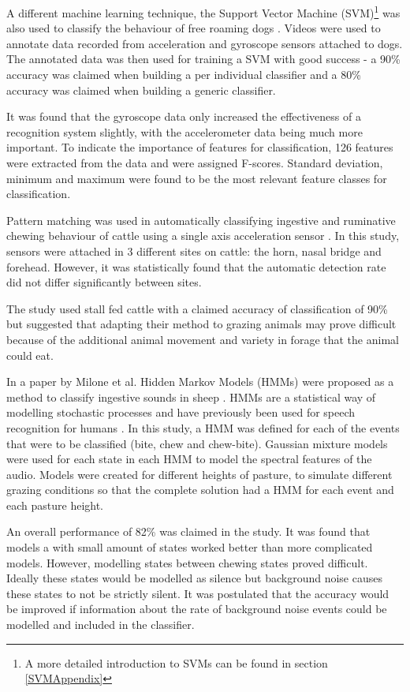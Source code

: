 A different machine learning technique, the Support Vector Machine (SVM)\footnote{A more detailed introduction to SVMs can be found in section \ref{SVMAppendix}} was also used to classify the behaviour of free roaming dogs \cite{Gerencser2013}. Videos were used to annotate data recorded from acceleration and gyroscope sensors attached to dogs. The annotated data was then used for training a SVM with good success - a 90\% accuracy was claimed when building a per individual classifier and a 80\% accuracy was claimed when building a generic classifier. 

It was found that the gyroscope data only increased the effectiveness of a recognition system slightly, with the accelerometer data being much more important. To indicate the importance of features for classification, 126 features were extracted from the data and were assigned F-scores. Standard deviation, minimum and maximum were found to be the most relevant feature classes for classification. 

Pattern matching was used in automatically classifying ingestive and ruminative chewing behaviour of cattle using a single axis acceleration sensor \cite{Tani2013}. In this study, sensors were attached in 3 different sites on cattle: the horn, nasal bridge and forehead. However, it was statistically found that the automatic detection rate did not differ significantly between sites. 

The study used stall fed cattle with a claimed accuracy of classification of 90\% but suggested that adapting their method to grazing animals may prove difficult because of the additional animal movement and variety in forage that the animal could eat.

In a paper by Milone et al. Hidden Markov Models (HMMs) were proposed as a method to classify ingestive sounds in sheep \cite{Milone2009}. HMMs are a statistical way of modelling stochastic processes and have previously been used for speech recognition for humans \cite{Milone2009}. In this study, a HMM was defined for each of the events that were to be classified (bite, chew and chew-bite). Gaussian mixture models were used for each state in each HMM to model the spectral features of the audio. Models were created for different heights of pasture, to simulate different grazing conditions so that the complete solution had a HMM for each event and each pasture height. 

An overall performance of 82\% was claimed in the study. It was found that models a with small amount of states worked better than more complicated models. However, modelling states between chewing states proved difficult. Ideally these states would be modelled as silence but background noise causes these states to not be strictly silent. It was postulated that the accuracy would be improved if information about the rate of background noise events could be modelled and included in the classifier. 

